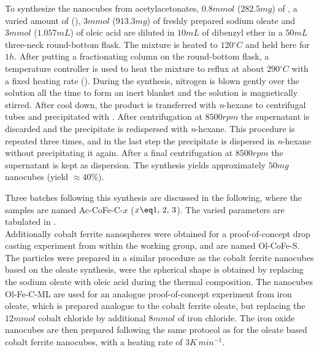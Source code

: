 \documentclass[\main/dresen_thesis.tex]{subfiles}
\begin{document}
    To synthesize the nanocubes from acetylacetonates, $0.8 \unit{mmol}$ ($282.5 \unit{mg}$) of , a varied amount of  (), $3 \unit{mmol}$ ($913.3 \unit{mg}$) of freshly prepared sodium oleate and $3 \unit{mmol}$ ($1.057 \unit{mL}$) of oleic acid are diluted in $10 \unit{mL}$ of dibenzyl ether in a $50 \unit{mL}$ three-neck round-bottom flask.
    The mixture is heated to $120 \unit{^\circ C}$ and held here for $1 \unit{h}$.
    After putting a fractionating column on the round-bottom flask, a temperature controller is used to heat the mixture to reflux at about $290 \unit{^\circ C}$ with a fixed heating rate ().
    During the synthesis, nitrogen is blown gently over the solution all the time to form an inert blanket and the solution is magnetically stirred.
    After cool down, the product is transferred with \textit{n}-hexane to centrifugal tubes and precipitated with .
    After centrifugation at $8500 \unit{rpm}$ the supernatant is discarded and the precipitate is redispersed with \textit{n}-hexane.
    This procedure is repeated three times, and in the last step the precipitate is dispersed in \textit{n}-hexane without precipitating it again.
    After a final centrifugation at $8500 \unit{rpm}$ the supernatant is kept as dispersion.
    The synthesis yields approximately $50 \unit{mg}$ nanocubes (yield $\approx 40 \%$).

    Three batches following this synthesis are discussed in the following, where the samples are named Ac-CoFe-C-$x$ ($x \eq 1,\, 2,\, 3$). The varied parameters are tabulated in .
    \\

    Additionally cobalt ferrite nanospheres were obtained for a proof-of-concept drop casting experiment from within the working group, and are named Ol-CoFe-S.
    The particles were prepared in a similar procedure as the cobalt ferrite nanocubes based on the oleate synthesis, were the spherical shape is obtained by replacing the sodium oleate with oleic acid during the thermal composition.
    The nanocubes Ol-Fe-C-ML are used for an analogue proof-of-concept experiment from iron oleate, which is prepared analogue to the cobalt ferrite oleate, but replacing the $12 \unit{mmol}$ cobalt chloride by additional $8 \unit{mmol}$ of iron chloride.
    The iron oxide nanocubes are then prepared following the same protocol as for the oleate based cobalt ferrite nanocubes, with a heating rate of $3 \unit{K\, min^{-1}}$.
\end{document}
